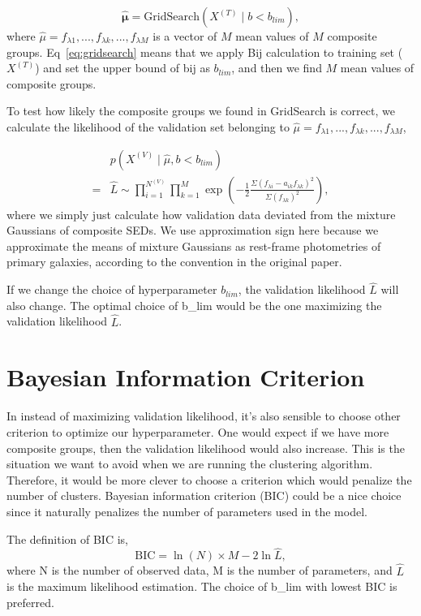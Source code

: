 \documentclass[12pt,letterpaper]{article}
\begin{document}
\begin{equation}
    \hat{ \mathbf{\mu} } = 
    \mathrm{GridSearch}(X^{(T)} \mid b < b_{lim}),
    \label{eq:gridsearch}
\end{equation}
where $\hat{\mu} = f_{\lambda 1}, ..., f_{\lambda k}, ..., f_{\lambda M}$ is a vector of $M$ mean values of $M$ composite groups.
Eq~\ref{eq:gridsearch} means that we apply Bij calculation to training set ($X^{(T)}$) and set the upper bound of bij as $b_{lim}$, and then we find $M$ mean values of composite groups.

To test how likely the composite groups we found in GridSearch is correct, we calculate the likelihood of the validation set belonging to $\hat \mu = f_{\lambda 1}, ..., f_{\lambda k}, ..., f_{\lambda M}$,

\begin{equation}
    \begin{split}
        &p(X^{(V)} \mid \hat \mu, b < b_{lim}) \\ 
        = &\hat L 
        \sim
        \prod_{i=1}^{N^{(V)}} \prod_{k=1}^{M}         
        \exp{\left( - \frac{1}{2} \frac{ \Sigma (f_{\lambda i} - a_{ik} f_{\lambda k} )^2 }{\Sigma (f_{\lambda k})^2} \right)},   
    \end{split}
    \label{eq:likelihood}
\end{equation}
where we simply just calculate how validation data deviated from the mixture Gaussians of composite SEDs.
We use approximation sign here because we approximate the means of mixture Gaussians as rest-frame photometries of primary galaxies, according to the convention in the original paper.

If we change the choice of hyperparameter $b_{lim}$, the validation likelihood $\hat L$ will also change.
The optimal choice of b\_lim would be the one maximizing the validation likelihood $\hat L$.


\section*{Bayesian Information Criterion}
In instead of maximizing validation likelihood, it's also sensible to choose other criterion to optimize our hyperparameter.
One would expect if we have more composite groups, then the validation likelihood would also increase.
This is the situation we want to avoid when we are running the clustering algorithm.
Therefore, it would be more clever to choose a criterion which would penalize the number of clusters.
Bayesian information criterion (BIC) could be a nice choice since it naturally penalizes the number of parameters used in the model.

The definition of BIC is,
\begin{equation}
    \mathrm{BIC} = \ln{(N)} \times M - 2\ln{\hat L},
\end{equation}
where N is the number of observed data, M is the number of parameters, and $\hat L$ is the maximum likelihood estimation.
The choice of b\_lim with lowest BIC is preferred. 
\end{document}
